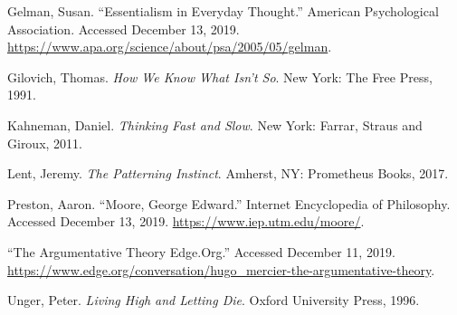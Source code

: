 \documentclass[12pt, openany]{book}
\begin{document}
\leavevmode\hypertarget{ref-gelmanEssentialismEverydayThought}{}%
Gelman, Susan. ``Essentialism in Everyday Thought.'' American Psychological Association. Accessed December 13, 2019. \url{https://www.apa.org/science/about/psa/2005/05/gelman}.

\leavevmode\hypertarget{ref-gilovichHowWeKnow1991}{}%
Gilovich, Thomas. \emph{How We Know What Isn't So}. New York: The Free Press, 1991.

\leavevmode\hypertarget{ref-kahnemanThinkingFastSlow2011}{}%
Kahneman, Daniel. \emph{Thinking Fast and Slow}. New York: Farrar, Straus and Giroux, 2011.

\leavevmode\hypertarget{ref-lentPatterningInstinct2017}{}%
Lent, Jeremy. \emph{The Patterning Instinct}. Amherst, NY: Prometheus Books, 2017.

\leavevmode\hypertarget{ref-prestonMooreGeorgeEdward}{}%
Preston, Aaron. ``Moore, George Edward.'' Internet Encyclopedia of Philosophy. Accessed December 13, 2019. \url{https://www.iep.utm.edu/moore/}.

\leavevmode\hypertarget{ref-ArgumentativeTheoryEdge}{}%
``The Argumentative Theory \textbar{} Edge.Org.'' Accessed December 11, 2019. \url{https://www.edge.org/conversation/hugo_mercier-the-argumentative-theory}.

\leavevmode\hypertarget{ref-ungerLivingHighLetting1996}{}%
Unger, Peter. \emph{Living High and Letting Die}. Oxford University Press, 1996.
\end{document}
